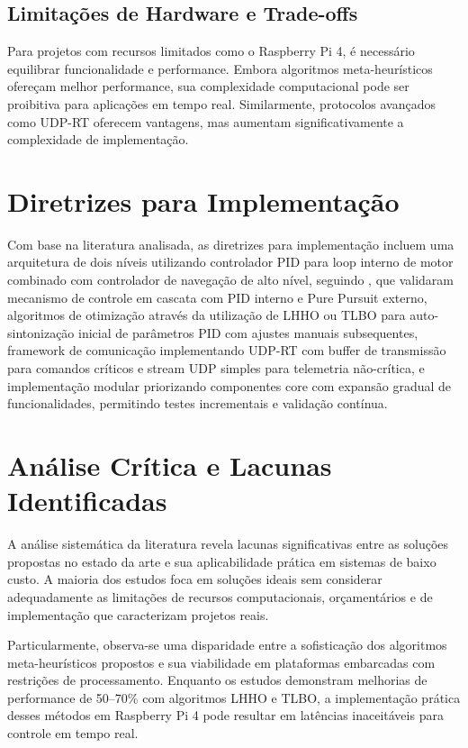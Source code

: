 \subsection{Limitações de Hardware e Trade-offs}
\label{subsec:limitacoes-hardware}

Para projetos com recursos limitados como o Raspberry Pi 4, é necessário equilibrar funcionalidade e performance. Embora algoritmos meta-heurísticos ofereçam melhor performance, sua complexidade computacional pode ser proibitiva para aplicações em tempo real. Similarmente, protocolos avançados como UDP-RT oferecem vantagens, mas aumentam significativamente a complexidade de implementação.

\section{Diretrizes para Implementação}
\label{sec:diretrizes-implementacao}

Com base na literatura analisada, as diretrizes para implementação incluem uma arquitetura de dois níveis utilizando controlador PID para loop interno de motor combinado com controlador de navegação de alto nível, seguindo , que validaram mecanismo de controle em cascata com PID interno e Pure Pursuit externo, algoritmos de otimização através da utilização de LHHO ou TLBO para auto-sintonização inicial de parâmetros PID com ajustes manuais subsequentes, framework de comunicação implementando UDP-RT com buffer de transmissão para comandos críticos e stream UDP simples para telemetria não-crítica, e implementação modular priorizando componentes core com expansão gradual de funcionalidades, permitindo testes incrementais e validação contínua.

\section{Análise Crítica e Lacunas Identificadas}
\label{sec:analise-critica}

A análise sistemática da literatura revela lacunas significativas entre as soluções propostas no estado da arte e sua aplicabilidade prática em sistemas de baixo custo. A maioria dos estudos foca em soluções ideais sem considerar adequadamente as limitações de recursos computacionais, orçamentários e de implementação que caracterizam projetos reais.

Particularmente, observa-se uma disparidade entre a sofisticação dos algoritmos meta-heurísticos propostos e sua viabilidade em plataformas embarcadas com restrições de processamento. Enquanto os estudos demonstram melhorias de performance de 50--70\% com algoritmos LHHO e TLBO, a implementação prática desses métodos em Raspberry Pi 4 pode resultar em latências inaceitáveis para controle em tempo real.

